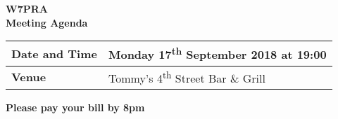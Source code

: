\documentclass[letter,11pt]{extarticle}
\begin{document}
	\thispagestyle{empty}
	
	\begin{center}
		\textbf{W7PRA\\Meeting Agenda}
		\vspace{0.33cm}
	\end{center}
	
	\begin{center}
		\begin{tabular}{| m{3.0cm} | m{7.5cm} |} \hline
			\textbf{Date and Time} & Monday 17\textsuperscript{th} September 2018 at 19:00 \\ \hline
			\textbf{Venue} & Tommy's 4\textsuperscript{th} Street Bar \& Grill \\ \hline
				\end{tabular}
	\end{center}
	
	\begin{center}
		\textbf{Please pay your bill by 8pm}
	\end{center}
	
\end{document}

